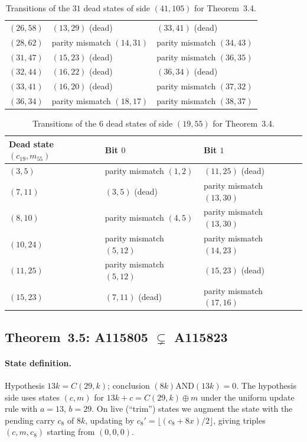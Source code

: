 \documentclass[11pt]{article}
\begin{document}
\begin{table}[ht]
\begin{tabular}{lll}
$(26,58)$ & $(13,29)$ (dead) & $(33,41)$ (dead) \\
$(28,62)$ & parity mismatch $(14,31)$ & parity mismatch $(34,43)$ \\
$(31,47)$ & $(15,23)$ (dead) & parity mismatch $(36,35)$ \\
$(32,44)$ & $(16,22)$ (dead) & $(36,34)$ (dead) \\
$(33,41)$ & $(16,20)$ (dead) & parity mismatch $(37,32)$ \\
$(36,34)$ & parity mismatch $(18,17)$ & parity mismatch $(38,37)$ \\
\hline
\end{tabular}
\caption{Transitions of the $31$ dead states of side $(41,105)$ for Theorem~3.4.}
\label{tab:app-34d41}
\end{table}

\begin{table}[ht]
\centering
\small
\begin{tabular}{lll}
\hline
Dead state $(c_{19}, m_{55})$ & Bit $0$ & Bit $1$ \\
\hline
$(3,5)$ & parity mismatch $(1,2)$ & $(11,25)$ (dead) \\
$(7,11)$ & $(3,5)$ (dead) & parity mismatch $(13,30)$ \\
$(8,10)$ & parity mismatch $(4,5)$ & parity mismatch $(13,30)$ \\
$(10,24)$ & parity mismatch $(5,12)$ & parity mismatch $(14,23)$ \\
$(11,25)$ & parity mismatch $(5,12)$ & $(15,23)$ (dead) \\
$(15,23)$ & $(7,11)$ (dead) & parity mismatch $(17,16)$ \\
\hline
\end{tabular}
\caption{Transitions of the $6$ dead states of side $(19,55)$ for Theorem~3.4.}
\label{tab:app-34d19}
\end{table}

\subsection{Theorem~3.5: A115805 $\subsetneq$ A115823}
\label{app:thm35}

\paragraph{State definition.}
Hypothesis $13k = C(29,k)$; conclusion $(8k) \mathbin{\mathrm{AND}} (13k) = 0$. The hypothesis side uses states $(c, m)$ for $13k + c = C(29,k) \oplus m$ under the uniform update rule with $a = 13$, $b = 29$. On live (``trim'') states we augment the state with the pending carry $c_8$ of $8k$, updating by $c_8' = \lfloor (c_8 + 8x)/2 \rfloor$, giving triples $(c, m, c_8)$ starting from $(0,0,0)$.
\end{document}
